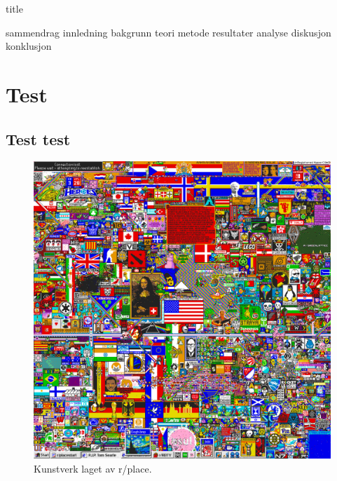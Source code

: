



{title}
\newpage

\tableofcontents
\listoffigures
\listoftables
\lstlistoflistings
\newpage


{sammendrag}
{innledning}
{bakgrunn}
{teori}
{metode}
{resultater}
{analyse}
{diskusjon}
{konklusjon}

\section{Test}
\subsection{Test test}

\begin{figure}[h]\label{r/place}
    \centering
    \includegraphics[width=.6\textwidth]{img/r_place.png}
    \caption{Kunstverk laget av r/place.}
\end{figure}

\newpage
    
\printbibliography[heading=bibintoc]
    


